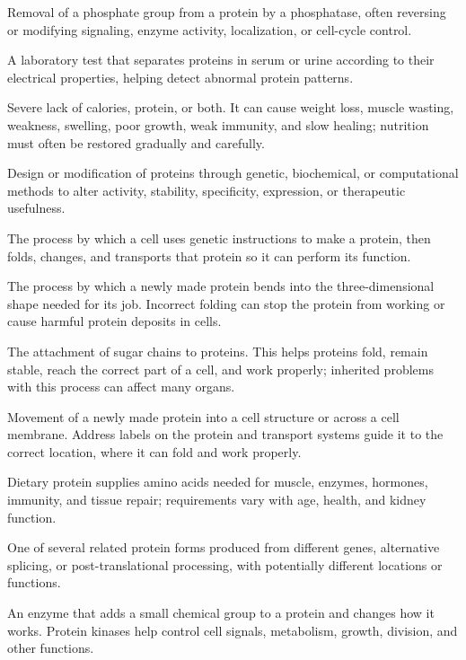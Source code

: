  Removal of a phosphate group from a protein by a phosphatase, often reversing or modifying signaling, enzyme activity, localization, or cell-cycle control.

 A laboratory test that separates proteins in serum or urine according to their electrical properties, helping detect abnormal protein patterns.

 Severe lack of calories, protein, or both. It can cause weight loss, muscle wasting, weakness, swelling, poor growth, weak immunity, and slow healing; nutrition must often be restored gradually and carefully.

 Design or modification of proteins through genetic, biochemical, or computational methods to alter activity, stability, specificity, expression, or therapeutic usefulness.

 The process by which a cell uses genetic instructions to make a protein, then folds, changes, and transports that protein so it can perform its function.

 The process by which a newly made protein bends into the three-dimensional shape needed for its job. Incorrect folding can stop the protein from working or cause harmful protein deposits in cells.

 The attachment of sugar chains to proteins. This helps proteins fold, remain stable, reach the correct part of a cell, and work properly; inherited problems with this process can affect many organs.

 Movement of a newly made protein into a cell structure or across a cell membrane. Address labels on the protein and transport systems guide it to the correct location, where it can fold and work properly.

 Dietary protein supplies amino acids needed for muscle, enzymes, hormones, immunity, and tissue repair; requirements vary with age, health, and kidney function.

 One of several related protein forms produced from different genes, alternative splicing, or post-translational processing, with potentially different locations or functions.

 An enzyme that adds a small chemical group to a protein and changes how it works. Protein kinases help control cell signals, metabolism, growth, division, and other functions.


